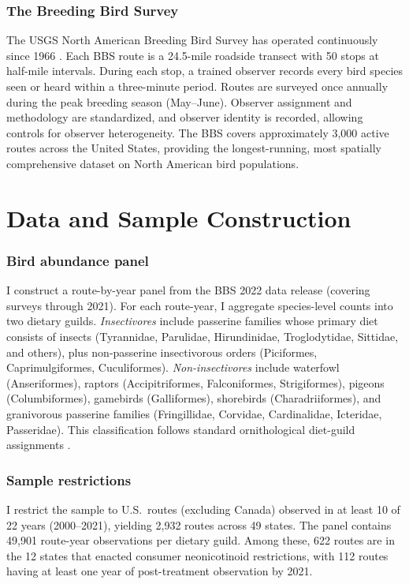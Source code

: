 \documentclass[12pt]{article}
\begin{document}
\subsubsection*{The Breeding Bird Survey} The USGS North American Breeding Bird Survey has operated continuously since 1966 \citep{sauer2017first}. Each BBS route is a 24.5-mile roadside transect with 50 stops at half-mile intervals. During each stop, a trained observer records every bird species seen or heard within a three-minute period. Routes are surveyed once annually during the peak breeding season (May--June). Observer assignment and methodology are standardized, and observer identity is recorded, allowing controls for observer heterogeneity. The BBS covers approximately 3,000 active routes across the United States, providing the longest-running, most spatially comprehensive dataset on North American bird populations.


\section{Data and Sample Construction}

\subsubsection*{Bird abundance panel} I construct a route-by-year panel from the BBS 2022 data release (covering surveys through 2021). For each route-year, I aggregate species-level counts into two dietary guilds. \textit{Insectivores} include passerine families whose primary diet consists of insects (Tyrannidae, Parulidae, Hirundinidae, Troglodytidae, Sittidae, and others), plus non-passerine insectivorous orders (Piciformes, Caprimulgiformes, Cuculiformes). \textit{Non-insectivores} include waterfowl (Anseriformes), raptors (Accipitriformes, Falconiformes, Strigiformes), pigeons (Columbiformes), gamebirds (Galliformes), shorebirds (Charadriiformes), and granivorous passerine families (Fringillidae, Corvidae, Cardinalidae, Icteridae, Passeridae). This classification follows standard ornithological diet-guild assignments \citep{wilman2014eltontraits}.

\subsubsection*{Sample restrictions} I restrict the sample to U.S.\ routes (excluding Canada) observed in at least 10 of 22 years (2000--2021), yielding 2,932 routes across 49 states. The panel contains 49,901 route-year observations per dietary guild. Among these, 622 routes are in the 12 states that enacted consumer neonicotinoid restrictions, with 112 routes having at least one year of post-treatment observation by 2021.
\end{document}

